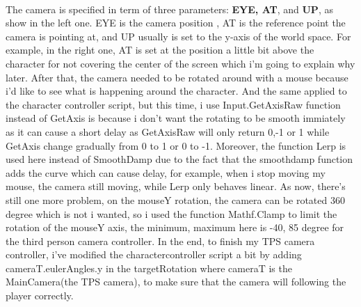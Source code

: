 \documentclass[a4paper, 13pt]{extarticle}
\begin{document}
  	\\[0.05cm]
 	 The camera is specified in term of three parameters: {\bfseries EYE, AT}, and {\bfseries UP}, as show in the left one. EYE is the camera position , AT is the reference point the camera is pointing at, and UP usually is set to the y-axis of the world space. For example, in the right one, AT is set at the position a little bit above the character for not covering the center of the screen which i'm going to explain why later.
 	 After that, the camera needed to be rotated around with a mouse because i'd like to see what is happening around the character. And the same applied to the character controller script, but this time, i use Input.GetAxisRaw function instead of GetAxis is because i don't want the rotating to be smooth immiately as it can cause a short delay as GetAxisRaw will only return 0,-1 or 1 while GetAxis change gradually from 0 to 1 or 0 to -1.  
 	 Moreover, the function Lerp is used here instead of SmoothDamp due to the fact that the smoothdamp function adds the curve which can cause delay, for example, when i stop moving my mouse, the camera still moving, while Lerp only behaves linear. As now, there's still one more problem, on the mouseY rotation, the camera can be rotated 360 degree which is not i wanted, so i used the function Mathf.Clamp to limit the rotation of the mouseY axis, the minimum, maximum here is -40, 85 degree for the third person camera controller. In the end, to finish my TPS camera controller, i've modified the charactercontroller script a bit by adding cameraT.eulerAngles.y in the targetRotation where cameraT is the MainCamera(the TPS camera), to make sure that the camera will following the player correctly.
 	 
\end{document}
